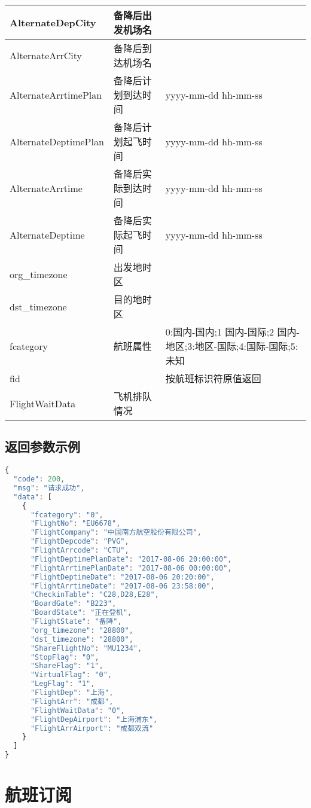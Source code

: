\begin{longtable}{|m{100pt}|m{100pt}|m{180pt}|}
AlternateDepCity&备降后出发机场名&\\
\hline
AlternateArrCity&备降后到达机场名&\\
\hline
AlternateArrtimePlan&备降后计划到达时间&yyyy-mm-dd hh-mm-ss\\
\hline
AlternateDeptimePlan&备降后计划起飞时间&yyyy-mm-dd hh-mm-ss\\
\hline
AlternateArrtime&备降后实际到达时间&yyyy-mm-dd hh-mm-ss\\
\hline
AlternateDeptime&备降后实际起飞时间&yyyy-mm-dd hh-mm-ss\\
\hline
org\_timezone&出发地时区&\\
\hline
dst\_timezone&目的地时区&\\
\hline
fcategory&航班属性&0:国内-国内;1 国内-国际;2 国内-地区;3:地区-国际;4:国际-国际;5:未知\\
\hline
fid&&按航班标识符原值返回\\
\hline
FlightWaitData&飞机排队情况&\\
\hline
\end{longtable}

\section{返回参数示例}


\begin{lstlisting}[language=JavaScript]
{
  "code": 200,
  "msg": "请求成功",
  "data": [
    {
      "fcategory": "0",
      "FlightNo": "EU6678",
      "FlightCompany": "中国南方航空股份有限公司",
      "FlightDepcode": "PVG",
      "FlightArrcode": "CTU",
      "FlightDeptimePlanDate": "2017-08-06 20:00:00",
      "FlightArrtimePlanDate": "2017-08-06 00:00:00",
      "FlightDeptimeDate": "2017-08-06 20:20:00",
      "FlightArrtimeDate": "2017-08-06 23:58:00",
      "CheckinTable": "C28,D28,E28",
      "BoardGate": "B223",
      "BoardState": "正在登机",
      "FlightState": "备降",
      "org_timezone": "28800",
      "dst_timezone": "28800",
      "ShareFlightNo": "MU1234",
      "StopFlag": "0",
      "ShareFlag": "1",
      "VirtualFlag": "0",
      "LegFlag": "1",
      "FlightDep": "上海",
      "FlightArr": "成都",
      "FlightWaitData": "0",
      "FlightDepAirport": "上海浦东",
      "FlightArrAirport": "成都双流"
    }
  ]
}
\end{lstlisting}


\chapter{航班订阅}


